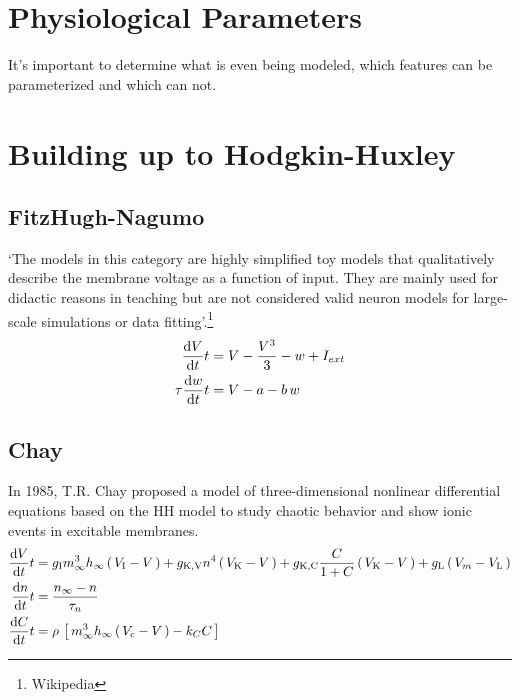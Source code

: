 \documentclass[../../Orator.tex]{subfiles}
\begin{document}
\newpage
\section{Physiological Parameters}
It's important to determine what is even being modeled, which features can be parameterized and which can not.


\newpage
\section{Building up to Hodgkin-Huxley}

\subsection{FitzHugh-Nagumo}
`The models in this category are highly simplified toy models that qualitatively describe the membrane voltage as a function of input. They are mainly used for didactic reasons in teaching but are not considered valid neuron models for large-scale simulations or data fitting'.\footnote{Wikipedia}
\begin{subequations}\label{eq:FitNagSys}
    \begin{align}
        \ode{V}{t} &= V - \frac{V^3}{3} - w + I_{ext} \\ 
        \tau\ode{w}{t} &= V - a - b\,w 
    \end{align}
\end{subequations}


\subsection{Chay}
In 1985, T.R. Chay proposed a model of three-dimensional nonlinear differential equations based on the HH model to study chaotic behavior and show ionic events in excitable membranes. 
\begin{subequations}\label{eq:ChaySys}
    \begin{align}
        \ode{V}{t} &= g_\rmm{I}  m^3_\infty h_\infty \br{V_\rmm{I} - V} + g_\rmm{K, V} n^4 \br{V_\rmm{K} - V} + g_\rmm{K, C}  \frac{C}{1+C}\br{V_\rmm{K} - V} + g_\rmm{L} \br{V_m - V_\rmm{L}} \\ 
        \ode{n}{t} &= \frac{n_\infty - n}{\tau_n} \\
        \ode{C}{t} &= \rho \, \sbr{m^3_\infty h_\infty \br{V_c - V} - k_C C}
    \end{align}
\end{subequations}
\end{document}
